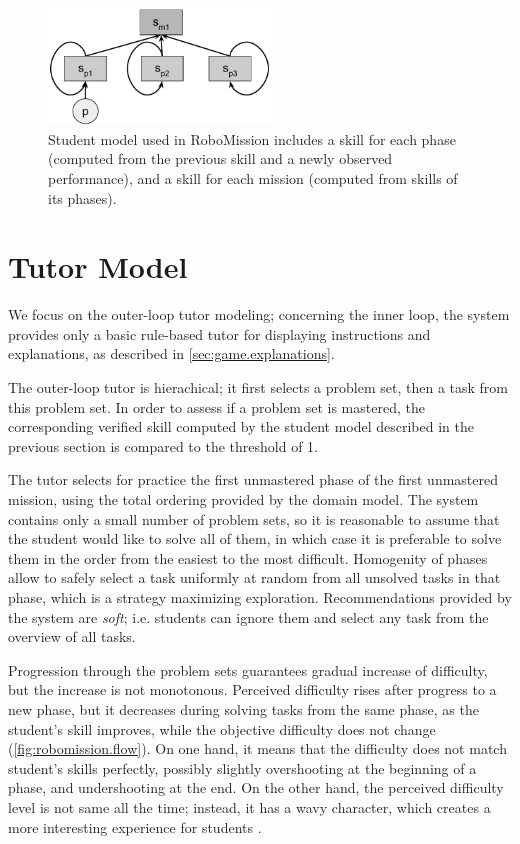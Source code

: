 \begin{figure}[htb]
\centering
\includegraphics[height=31mm]{img/robomission-student-model}
\caption{%
  Student model used in RoboMission includes a skill for each phase
  (computed from the previous skill and a newly observed performance),
  and a skill for each mission (computed from skills of its phases).}
\label{fig:robomission.student-model}
\end{figure}

\section{Tutor Model}
\label{robomission.tutor}

We focus on the outer-loop tutor modeling;
concerning the inner loop, the system provides only a basic
rule-based tutor for displaying instructions and explanations,
as described in \cref{sec:game.explanations}.

The outer-loop tutor is hierachical;
it first selects a problem set, then a task from this problem set.
In order to assess if a problem set is mastered,
the corresponding verified skill
computed by the student model described in the previous section
is compared to the threshold of 1. %

The tutor selects for practice the first unmastered phase of the first
unmastered mission, using the total ordering provided by the domain model.
The system contains only a small number of problem sets,
so it is reasonable to assume that the student would like to solve all of
them,
in which case it is preferable to solve them in the order from the
easiest to the most difficult.
Homogenity of phases allow to safely select a task uniformly at random from
all unsolved tasks in that phase, which is a strategy maximizing exploration.
Recommendations provided by the system are \emph{soft};
i.e. students can ignore them and select any task
from the overview of all tasks.

Progression through the problem sets guarantees gradual increase of difficulty,
but the increase is not monotonous.
Perceived difficulty rises after progress to a new phase,
but it decreases during solving tasks from the same phase,
as the student's skill improves, while the objective difficulty does not change
(\cref{fig:robomission.flow}).
On one hand, it means that the difficulty does not match student's
skills perfectly, possibly slightly overshooting at the beginning of a phase,
and undershooting at the end.
On the other hand, the perceived difficulty level is not
same all the time; instead, it has a wavy character, which creates a more
interesting experience for students %
\cite{book-of-lenses}.

